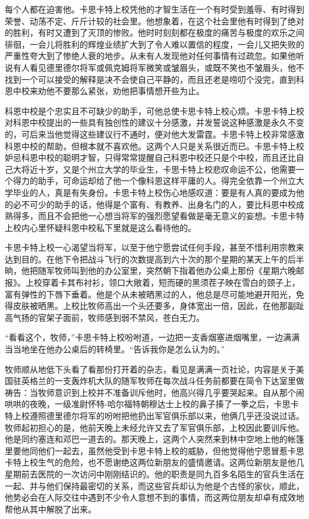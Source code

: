     每个人都在迫害他。卡思卡特上校凭他的才智生活在一个有时受到羞辱、有时得到荣誉、动荡不定、斤斤计较的社会里。他想象着，在这个社会里他有时得到了绝对的胜利，有时又遭到了灭顶的惨败。他时时刻刻都在极度的痛苦与极度的欢乐之间徘徊，一会儿将胜利的辉煌业绩扩大到了令人难以置信的程度，一会儿又把失败的严重性夸大到了惨绝人衰的地步。从未有人发现他对任何事情有过疏忽。如果他听说有人看见德里德尔将军或佩克姆将军微笑或皱眉头，或既不笑也不皱眉头，他不找到一个可以接受的解释是决不会使自己平静的，而且还老是唠叨个没完，直到科恩中校来劝他不要那么紧张，劝他把事情想开些为止。

    科恩中校是个忠实且不可缺少的助手，可他总使卡思卡特上校心烦。卡思卡特上校对科恩中校提出的一些具有独创性的建议十分感激，并发誓说这种感激是永久不变的，可后来当他觉得这些建议行不通时，便对他大发雷霆。卡思卡特上校非常感激科恩中校的帮助，但根本就不喜欢他。这两个人只是关系很近而已。卡思卡特上校妒忌科恩中校的聪明才智，只得常常提醒自己科恩中校还只是个中校，而且还比自己大将近十岁，又是个州立大学的毕业生，卡思卡特上校悲叹命运不公，他需要一个得力的助手，可命运却给了他一个像科恩这样平庸的人。得完全依靠一个州立大学毕业的人，真是有失身份。卡思卡特上校伤心地感叹道：要是有人真的要成为他的必不可少的助手的话，他得是个富有、有教养、出身名门的人，要比科恩中校成熟得多，而且不会把他一心想当将军的强烈愿望看做是毫无意义的妄想。卡思卡特上校内心里怀疑科恩中校私下里就是这么看待他的。

 


    卡思卡特上校一心渴望当将军，以至于他宁愿尝试任何手段，甚至不惜利用宗教来达到目的。在他下令把战斗飞行的次数提高到六十次的那个星期的某天上午的后半晌，他把随军牧师叫到他的办公室里，突然朝下指着他办公桌上那份《星期六晚邮报》。上校穿着卡其布衬衫，领口大敞着，短而硬的黑须茬子映在雪白的颈子上，富有弹性的下唇下垂着。他是个从未被晒黑过的人，他总是尽可能地避开阳光，免得皮肤被晒黑。上校比牧师高出一个头还要多，身体宽出一倍，因此，在他那副趾高气扬的官架子面前，牧师感到弱不禁风，苍白无力。

    “看看这个，牧师，”卡思卡特上校吩咐道，一边把一支香烟塞进烟嘴里，一边满满当当地坐在他办公桌后的转椅里。“告诉我你是怎么认为的。”

    牧师顺从地低下头看了看那份打开着的杂志，看见是满满一页社论，内容是关于美国驻英格兰的一支轰炸机大队的随军牧师在每次战斗任务前都要在简令下达室里做祷告：当牧师意识到上校并不准备训斥他时，他高兴得几乎要哭起来。自从那个闹哄哄的夜晚，一级准尉怀特-哈尔福特朝穆达士上校的鼻子揍了一拳之后，卡思卡特上校遵照德里德尔将军的吩咐把他扔出军官俱乐部以来，他俩几乎还没说过话。牧师起初担心的是，他前天晚上未经允许又去了军官俱乐部，上校因此要训斥他。他是同约塞连和邓巴一道去的。那天晚上，这两个人突然来到林中空地上他的帐篷里要他同他们一起去，虽然他受到卡思卡特上校的威胁，但他觉得他宁愿冒惹卡思卡特上校生气的危险，也不愿谢绝这两位新朋友的盛情邀请。这两位新朋友是他几星期前去医院的一次访问中刚刚结识的。他的职责是同九百多名陌生的官兵生活在一起、并与他们保持最密切的关系，而这些官兵却认为他是个古怪的家伙，顺此，他势必会在人际交往中遇到不少令人意想不到的事情，而这两位朋友却卓有成效地帮他从其中解脱了出来。

